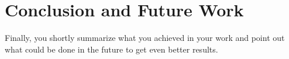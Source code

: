 \documentclass[10pt,twocolumn,letterpaper]{article}
\begin{document}
\section{Conclusion and Future Work}
Finally, you shortly summarize what you achieved in your work and point out what could be done in the future to get even better results. 










{\small


}
\end{document}

